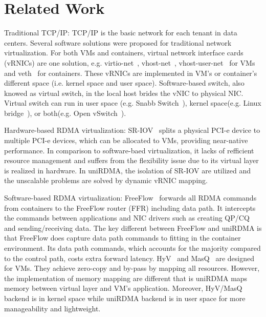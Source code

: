 \section{Related Work} \label{relatedwork}

Traditional TCP/IP: TCP/IP is the basic network for each tenant in data centers. Several software solutions were proposed for traditional network virtualization. For both VMs and containers, virtual network interface cards (vRNICs) are one solution, e.g. virtio-net~\cite{virtio-russell2008}, vhost-net~\cite{vhost-net},  vhost-user-net~\cite{vhost-user-net} for VMs and veth~\cite{veth} for containers. These vRNICs are implemented in VM's or container's different space (i.e. kernel space and user space). Software-based switch, also knowed as virtual switch, in the local host brides the vNIC to physical NIC. Virtual switch can run in user space (e.g. Snabb Switch~\cite{snabb}), kernel space(e.g. Linux bridge~\cite{linux-bridge}), or both(e.g. Open vSwitch~\cite{ovs-2015}). 

Hardware-based RDMA virtualization: SR-IOV~\cite{sr-iov} splits a physical PCI-e device to multiple PCI-e devices, which can be allocated to VMs, providing near-native performance. In comparison to software-baed virtualization, it lacks of refficient resource management and suffers from the flexibility issue due to its virtual layer is realized in hardware. In uniRDMA, the isolation of SR-IOV are utilized and the unscalable problems are solved by dynamic vRNIC mapping. 

Software-based RDMA virtualization: FreeFlow~\cite{kim2019freeflow} forwards all RDMA commands from containers to the FreeFlow router (FFR) including data path. It intercepts the commands between applications and NIC drivers such as creating QP/CQ and sending/receiving data. The key different between FreeFlow and uniRDMA is that FreeFlow does capture data path commands to fitting in the container environment. Its data path commands, which accounts for the majority compared to the control path, costs extra forward latency. HyV~\cite{pfefferle2015hybrid} and MasQ~\cite{he2020masq} are designed for VMs. They achieve zero-copy and by-pass by mapping all resources. However, the implementation of memory mapping are different that is uniRDMA maps memory between virtual layer and VM's application. Moreover, HyV/MasQ backend is in kernel space while uniRDMA backend is in user space for more manageability and lightweight.